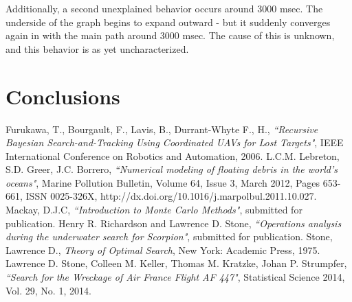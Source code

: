 \documentclass[a4paper]{article}
\begin{document}
Additionally, a second unexplained behavior occurs around 3000 msec. The underside of the graph begins to expand outward - but it suddenly converges again in with the main path around 3000 msec. The cause of this is unknown, and this behavior is as yet uncharacterized. 

\section{Conclusions}



\pagebreak

\begin{thebibliography}{10}
 Furukawa, T., Bourgault, F., Lavis, B., Durrant-Whyte F., H., \emph{``Recursive Bayesian Search-and-Tracking Using Coordinated UAVs for Lost Targets"}, IEEE International Conference on Robotics and Automation, 2006. 
 L.C.M. Lebreton, S.D. Greer, J.C. Borrero, \emph{``Numerical modeling of floating debris in the world’s oceans"}, Marine Pollution Bulletin, Volume 64, Issue 3, March 2012, Pages 653-661, ISSN 0025-326X, http://dx.doi.org/10.1016/j.marpolbul.2011.10.027.
 Mackay, D.J.C, \emph{``Introduction to Monte Carlo Methods"}, submitted for publication.
 Henry R. Richardson and Lawrence D. Stone, \emph{``Operations analysis during the underwater search for Scorpion"}, submitted for publication. 
 Stone, Lawrence D., \textit{Theory of Optimal Search}, New York: Academic Press, 1975.
 Lawrence D. Stone, Colleen M. Keller, Thomas M. Kratzke, Johan P. Strumpfer, \emph{``Search for the Wreckage of Air France Flight AF 447"}, Statistical Science 2014, Vol. 29, No. 1, 2014.
\end{thebibliography}
\end{document}
